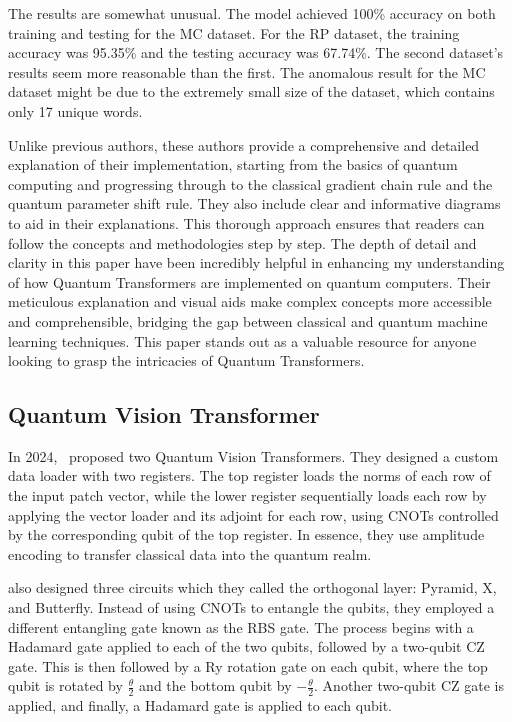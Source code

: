 The results are somewhat unusual. The model achieved 100\% accuracy
on both training and testing for the MC dataset. For the RP dataset,
the training accuracy was 95.35\% and the testing accuracy was
67.74\%. The second dataset's results seem more reasonable than the
first. The anomalous result for the MC dataset might be due to the
extremely small size of the dataset, which contains only 17 unique words.

Unlike previous authors, these authors provide a comprehensive and
detailed explanation of their implementation, starting from the
basics of quantum computing and progressing through to the classical
gradient chain rule and the quantum parameter shift rule. They also
include clear and informative diagrams to aid in their explanations.
This thorough approach ensures that readers can follow the concepts
and methodologies step by step. The depth of detail and clarity in
this paper have been incredibly helpful in enhancing my understanding
of how Quantum Transformers are implemented on quantum computers.
Their meticulous explanation and visual aids make complex concepts
more accessible and comprehensible, bridging the gap between
classical and quantum machine learning techniques. This paper stands
out as a valuable resource for anyone looking to grasp the
intricacies of Quantum Transformers.

\subsection{Quantum Vision Transformer}
\label{subsec:quantum_vision_transformer}
In 2024,~\citet{Cherrat_2024} proposed two Quantum Vision
Transformers. They designed a custom data loader with two registers.
The top register loads the norms of each row of the input patch
vector, while the lower register sequentially loads each row by
applying the vector loader and its adjoint for each row, using CNOTs
controlled by the corresponding qubit of the top register. In
essence, they use amplitude encoding to transfer classical data into
the quantum realm.

\citet{Cherrat_2024} also designed three circuits which they called
the orthogonal layer: Pyramid, X, and Butterfly. Instead of using
CNOTs to entangle the qubits, they employed a different entangling
gate known as the RBS gate. The process begins with a Hadamard gate
applied to each of the two qubits, followed by a two-qubit CZ gate.
This is then followed by a Ry rotation gate on each qubit, where the
top qubit is rotated by \(\frac{\theta}{2}\) and the bottom qubit by
\(-\frac{\theta}{2}\). Another two-qubit CZ gate is applied, and
finally, a Hadamard gate is applied to each qubit.

